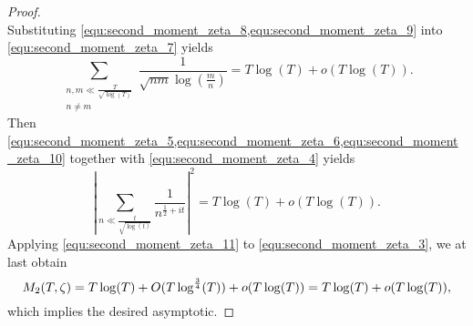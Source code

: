 \begin{proof}
\begin{equation}
      \end{equation}
      Substituting \cref{equ:second_moment_zeta_8,equ:second_moment_zeta_9} into \cref{equ:second_moment_zeta_7} yields
      \begin{equation}\label{equ:second_moment_zeta_10}
        \sum_{\substack{n,m \ll \frac{T}{\sqrt{\log(T)}} \\ n \neq m}}\frac{1}{\sqrt{nm}\log\left(\frac{m}{n}\right)} = T\log(T)+o(T\log(T)).
      \end{equation}
      Then \cref{equ:second_moment_zeta_5,equ:second_moment_zeta_6,equ:second_moment_zeta_10} together with \cref{equ:second_moment_zeta_4} yields
      \begin{equation}\label{equ:second_moment_zeta_11}
        \left|\sum_{n \ll \frac{t}{\sqrt{\log(t)}}}\frac{1}{n^{\frac{1}{2}+it}}\right|^{2} = T\log(T)+o(T\log(T)).
      \end{equation}
      Applying \cref{equ:second_moment_zeta_11} to \cref{equ:second_moment_zeta_3}, we at last obtain
      \[
        M_{2}(T,\zeta) = T\log(T)+O(T\log^{\frac{3}{4}}(T))+o(T\log(T)) = T\log(T)+o(T\log(T)),
      \]
      which implies the desired asymptotic.
    \end{proof}